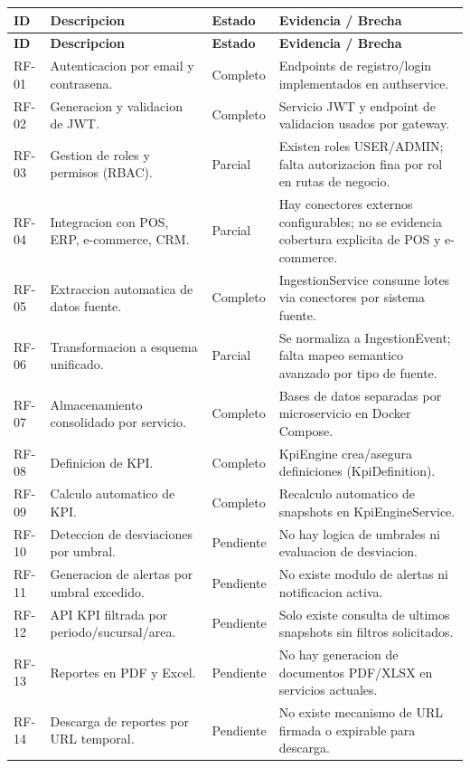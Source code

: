 \documentclass[12pt,a4paper]{article}
\begin{document}
\begin{longtable}{p{1.5cm}p{6.4cm}p{2.3cm}p{3.6cm}}
\toprule
\textbf{ID} & \textbf{Descripcion} & \textbf{Estado} & \textbf{Evidencia / Brecha} \\
\midrule
\endfirsthead
\toprule
\textbf{ID} & \textbf{Descripcion} & \textbf{Estado} & \textbf{Evidencia / Brecha} \\
\midrule
\endhead
RF-01 & Autenticacion por email y contrasena. & Completo & Endpoints de registro/login implementados en authservice. \\
RF-02 & Generacion y validacion de JWT. & Completo & Servicio JWT y endpoint de validacion usados por gateway. \\
RF-03 & Gestion de roles y permisos (RBAC). & Parcial & Existen roles USER/ADMIN; falta autorizacion fina por rol en rutas de negocio. \\
RF-04 & Integracion con POS, ERP, e-commerce, CRM. & Parcial & Hay conectores externos configurables; no se evidencia cobertura explicita de POS y e-commerce. \\
RF-05 & Extraccion automatica de datos fuente. & Completo & IngestionService consume lotes via conectores por sistema fuente. \\
RF-06 & Transformacion a esquema unificado. & Parcial & Se normaliza a IngestionEvent; falta mapeo semantico avanzado por tipo de fuente. \\
RF-07 & Almacenamiento consolidado por servicio. & Completo & Bases de datos separadas por microservicio en Docker Compose. \\
RF-08 & Definicion de KPI. & Completo & KpiEngine crea/asegura definiciones (KpiDefinition). \\
RF-09 & Calculo automatico de KPI. & Completo & Recalculo automatico de snapshots en KpiEngineService. \\
RF-10 & Deteccion de desviaciones por umbral. & Pendiente & No hay logica de umbrales ni evaluacion de desviacion. \\
RF-11 & Generacion de alertas por umbral excedido. & Pendiente & No existe modulo de alertas ni notificacion activa. \\
RF-12 & API KPI filtrada por periodo/sucursal/area. & Pendiente & Solo existe consulta de ultimos snapshots sin filtros solicitados. \\
RF-13 & Reportes en PDF y Excel. & Pendiente & No hay generacion de documentos PDF/XLSX en servicios actuales. \\
RF-14 & Descarga de reportes por URL temporal. & Pendiente & No existe mecanismo de URL firmada o expirable para descarga. \\

\end{longtable}
\end{document}

